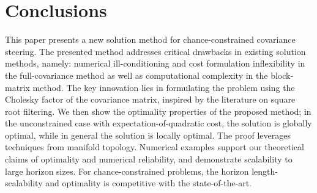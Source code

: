 \section{Conclusions}
This paper presents a new solution method for chance-constrained covariance steering. The presented method addresses critical drawbacks in existing solution methods, namely: numerical ill-conditioning and cost formulation inflexibility in the full-covariance method as well as computational complexity in the block-matrix method. The key innovation lies in formulating the problem using the Cholesky factor of the covariance matrix, inspired by the literature on square root filtering. We then show the optimality properties of the proposed method; in the unconstrained case with expectation-of-quadratic cost, the solution is globally optimal, while in general the solution is locally optimal. The proof leverages techniques from manifold topology. Numerical examples support our theoretical claims of optimality and numerical reliability, and demonstrate scalability to large horizon sizes. For chance-constrained problems, the horizon length-scalability and optimality is competitive with the state-of-the-art.